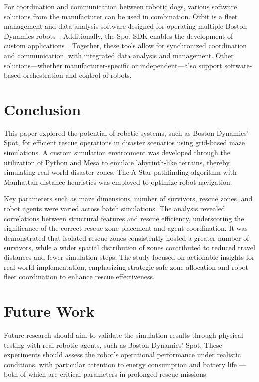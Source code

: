 \documentclass[3p,times,procedia]{elsarticle}
\begin{document}
For coordination and communication between robotic dogs, various software solutions from the manufacturer can be used in combination. 
Orbit is a fleet management and data analysis software designed for operating multiple Boston Dynamics robots\ \cite{boston_dynamics_2024_orbit}.
Additionally, the Spot SDK enables the development of custom applications\ \cite{boston_dynamics_2025_spot_sdk}.
Together, these tools allow for synchronized coordination and communication, with integrated data analysis and management. 
Other solutions—whether manufacturer-specific or independent—also support software-based orchestration and control of robots.

\section{Conclusion}
\label{sec:conclusion}

This paper explored the potential of robotic systems, such as Boston Dynamics' Spot, for efficient rescue operations in disaster scenarios using grid-based maze simulations.
A custom simulation environment was developed through the utilization of Python and Mesa to emulate labyrinth-like terrains, thereby simulating real-world disaster zones.
The A-Star pathfinding algorithm with Manhattan distance heuristics was employed to optimize robot navigation.

Key parameters such as maze dimensions, number of survivors, rescue zones, and robot agents were varied across batch simulations.
The analysis revealed correlations between structural features and rescue efficiency, underscoring the significance of the correct rescue zone placement and agent coordination.
It was demonstrated that isolated rescue zones consistently hosted a greater number of survivors, while a wider spatial distribution of zones contributed to reduced travel distances and fewer simulation steps.
The study focused on actionable insights for real-world implementation, emphasizing strategic safe zone allocation and robot fleet coordination to enhance rescue effectiveness.

\section{Future Work}
\label{sec:future_work}

Future research should aim to validate the simulation results through physical testing with real robotic agents, such as Boston Dynamics' Spot. These experiments should assess the robot’s operational performance under realistic conditions, with particular attention to energy consumption and battery life — both of which are critical parameters in prolonged rescue missions.
\end{document}
